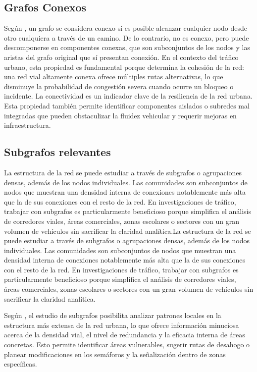 \subsection{Grafos Conexos}
Según \cite{coto_algoritmos_2003}, un grafo se considera conexo si es posible alcanzar cualquier nodo desde otro cualquiera a través de un camino. De lo contrario, no es conexo, pero puede 
descomponerse en componentes conexas, que son subconjuntos de los nodos y las aristas del grafo original que sí presentan conexión. En el contexto del tráfico urbano, 
esta propiedad es fundamental porque determina la cohesión de la red: una red vial altamente conexa ofrece múltiples rutas alternativas, lo que disminuye la probabilidad de 
congestión severa cuando ocurre un bloqueo o incidente. La conectividad es un indicador clave de la resiliencia de la red urbana. Esta propiedad también permite identificar 
componentes aislados o subredes mal integradas que pueden obstaculizar la fluidez vehicular y requerir mejoras en infraestructura.

\subsection{Subgrafos relevantes}
La estructura de la red se puede estudiar a través de subgrafos o agrupaciones densas, además de los nodos individuales. Las comunidades son subconjuntos de nodos que muestran 
una densidad interna de conexiones notablemente más alta que la de sus conexiones con el resto de la red. En investigaciones de tráfico, trabajar con subgrafos es 
particularmente beneficioso porque simplifica el análisis de corredores viales, áreas comerciales, zonas escolares o sectores con un gran volumen de vehículos sin sacrificar 
la claridad analítica.La estructura de la red se puede estudiar a través de subgrafos o agrupaciones densas, además de los nodos individuales. Las comunidades son subconjuntos 
de nodos que muestran una densidad interna de conexiones notablemente más alta que la de sus conexiones con el resto de la red. En investigaciones de tráfico, trabajar con 
subgrafos es particularmente beneficioso porque simplifica el análisis de corredores viales, áreas comerciales, zonas escolares o sectores con un gran volumen de vehículos 
sin sacrificar la claridad analítica.

Según \cite{cardillo_structural_2006}, el estudio de subgrafos posibilita analizar patrones locales en la estructura más extensa de la red urbana, lo que ofrece información 
minuciosa acerca de la densidad vial, el nivel de redundancia y la eficacia interna de áreas concretas. Esto permite identificar áreas vulnerables, sugerir rutas de desahogo 
o planear modificaciones en los semáforos y la señalización dentro de zonas específicas.

